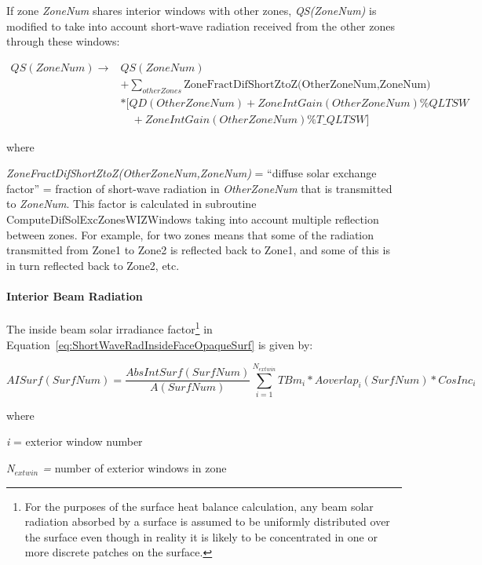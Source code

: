 If zone \emph{ZoneNum} shares interior windows with other zones, \emph{QS(ZoneNum)} is modified to take into account short-wave radiation received from the other zones through these windows:

\begin{equation}
\begin{array}{rl}
   QS(ZoneNum) \to & QS(ZoneNum) \\
                   &+ \sum_{otherZones}\text{ZoneFractDifShortZtoZ(OtherZoneNum,ZoneNum)} \\
                   &* [QD(OtherZoneNum) + ZoneIntGain(OtherZoneNum)\% QLTSW \\
                   &\quad + ZoneIntGain(OtherZoneNum)\% T\_QLTSW]
  \end{array}
\end{equation}

where

\emph{ZoneFractDifShortZtoZ(OtherZoneNum,ZoneNum)} = ``diffuse solar exchange factor'' = fraction of short-wave radiation in \emph{OtherZoneNum} that is transmitted to \emph{ZoneNum}. This factor is calculated in subroutine ComputeDifSolExcZonesWIZWindows taking into account multiple reflection between zones. For example, for two zones means that some of the radiation transmitted from Zone1 to Zone2 is reflected back to Zone1, and some of this is in turn reflected back to Zone2, etc.

\paragraph{Interior Beam Radiation}\label{interior-beam-radiation}

The inside beam solar irradiance factor\footnote{For the purposes of the surface heat balance calculation, any beam solar radiation absorbed by a surface is assumed to be uniformly distributed over the surface even though in reality it is likely to be concentrated in one or more discrete patches on the surface.} in Equation~\ref{eq:ShortWaveRadInsideFaceOpaqueSurf} is given by:

\begin{equation}
AISurf(SurfNum) = \frac{{AbsIntSurf(SurfNum)}}{{A(SurfNum)}}\sum\limits_{i = 1}^{{N_{extwin}}} {TB{m_i}*Aoverla{p_i}(SurfNum)*CosIn{c_i}}
\end{equation}

where

\emph{i} = exterior window number

\emph{N\(_{extwin}\) =} number of exterior windows in zone

